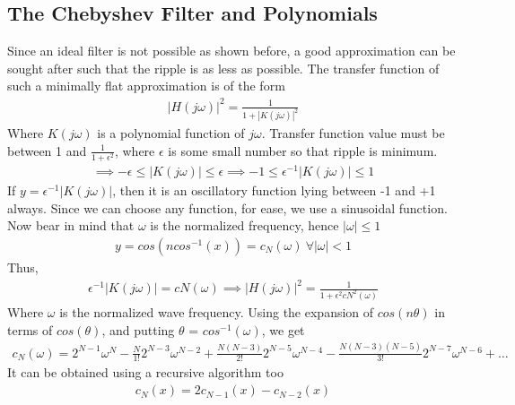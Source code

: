 \documentclass{article}
\begin{document}
\subsection{The Chebyshev Filter and Polynomials}
Since an ideal filter is not possible as shown before, a good approximation can be sought after such that the ripple is as less as possible.
The transfer function of such a minimally flat approximation is of the form
\begin{align}
    |H(j\omega)|^2 = \frac{1}{1+|K(j\omega)|^2}
\end{align}
Where $K(j\omega)$ is a polynomial function of $j\omega$.
Transfer function value must be between 1 and $\frac{1}{1+ {\epsilon}^2}$, where $\epsilon$ is some small number so that ripple is minimum. 
\begin{align}
    \implies -\epsilon \leq |K(j\omega)| \leq \epsilon
    \implies -1 \leq \epsilon^{-1}|K(j\omega)| \leq 1 
\end{align}
If $y = \epsilon^{-1}|K(j\omega)|$, then it is an oscillatory function lying between -1 and +1 always. Since we can choose any function, for ease, we use a sinusoidal function.
Now bear in mind that $\omega$ is the normalized frequency, hence $|\omega|\leq 1$
\begin{align}
    y = cos(n cos^{-1}(x)) = c_N(\omega) \: \forall |\omega|<1
\end{align}
Thus,
\begin{align}
    \epsilon^{-1}|K(j\omega)| = cN(\omega)
    \implies |H(j\omega)|^2 = \frac{1}{1+\epsilon^2cN^2(\omega)} 
\end{align}
Where $\omega$ is the normalized wave frequency.
Using the expansion of $cos(n\theta)$ in terms of $cos(\theta)$, and putting $\theta$ = $cos^{-1}(\omega)$, we get
\begin{align}
    c_N(\omega) = 2^{N-1}\omega^N - \frac{N}{1!}2^{N-3}\omega^{N-2} + \frac{N(N-3)}{2!}2^{N-5}\omega^{N-4} - \frac{N(N-3)(N-5)}{3!}2^{N-7}\omega^{N-6}+\ldots
\end{align}
It can be obtained using a recursive algorithm too
\begin{align}
    c_N(x) = 2c_{N-1}(x) - c_{N-2}(x)
\end{align}
\end{document}
